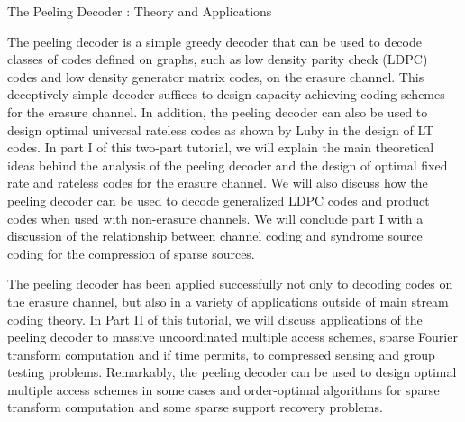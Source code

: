The Peeling Decoder : Theory and Applications

The peeling decoder is a simple greedy decoder that can be used to decode classes of codes defined on graphs, such as low density parity check (LDPC) codes and low density generator matrix codes, on the erasure channel.  This deceptively simple decoder suffices to design capacity achieving coding schemes for the erasure channel.  In addition, the peeling decoder can also be used to design optimal universal rateless codes as shown by Luby in the design of LT codes. In part I of this two-part tutorial, we will explain the main theoretical ideas behind the analysis of the peeling decoder and the design of optimal fixed rate and rateless codes for the erasure channel. We will also discuss how the peeling decoder can be used to decode generalized LDPC codes and product codes when used with non-erasure channels. We will conclude part I with a discussion of the relationship between channel coding and syndrome source coding for the compression of sparse sources.

The peeling decoder has been applied successfully not only to decoding codes on the erasure channel, but also in a variety of applications outside of main stream coding theory.  In Part II of this tutorial, we will discuss applications of the peeling decoder to massive uncoordinated multiple access schemes, sparse Fourier transform computation and if time permits, to compressed sensing and group testing problems. Remarkably, the peeling decoder can be used to design optimal multiple access schemes in some cases and order-optimal algorithms for sparse transform computation and some sparse support recovery problems. 